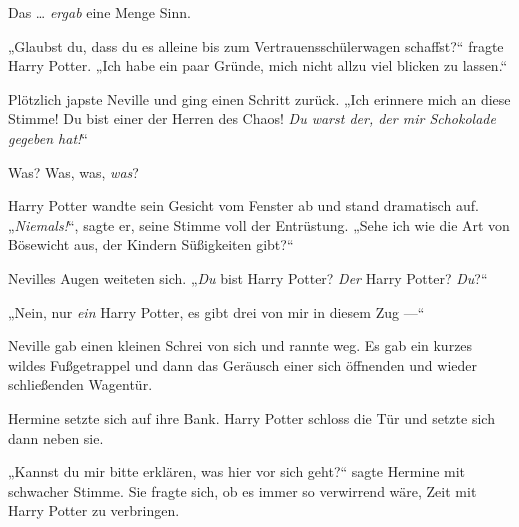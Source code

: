 Das … \emph{ergab} eine Menge Sinn.

„Glaubst du, dass du es alleine bis zum Vertrauensschülerwagen schaffst?“ fragte Harry Potter.
„Ich habe ein paar Gründe, mich nicht allzu viel blicken zu lassen.“

Plötzlich japste Neville und ging einen Schritt zurück.
„Ich erinnere mich an diese Stimme! Du bist einer der Herren des Chaos! \emph{Du warst der, der mir Schokolade gegeben hat!}“

Was? Was, was, \emph{was}?

Harry Potter wandte sein Gesicht vom Fenster ab und stand dramatisch auf.
„\emph{Niemals!}“, sagte er, seine Stimme voll der Entrüstung.
„Sehe ich wie die Art von Bösewicht aus, der Kindern Süßigkeiten gibt?“

Nevilles Augen weiteten sich.
„\emph{Du} bist Harry Potter? \emph{Der} Harry Potter? \emph{Du}?“

„Nein, nur \emph{ein} Harry Potter, es gibt drei von mir in diesem Zug —“

Neville gab einen kleinen Schrei von sich und rannte weg. Es gab ein kurzes wildes Fußgetrappel und dann das Geräusch einer sich öffnenden und wieder schließenden Wagentür.

Hermine setzte sich auf ihre Bank. Harry Potter schloss die Tür und setzte sich dann neben sie.

„Kannst du mir bitte erklären, was hier vor sich geht?“ sagte Hermine mit schwacher Stimme. Sie fragte sich, ob es immer so verwirrend wäre, Zeit mit Harry Potter zu verbringen.

